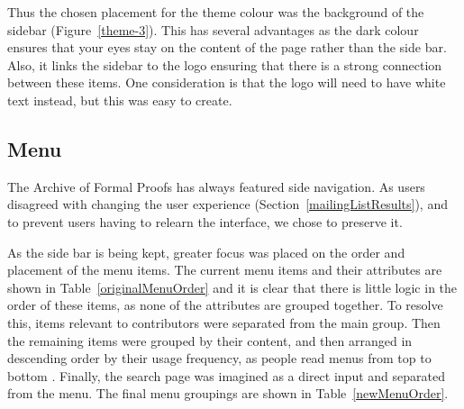 \documentclass[bsc,frontabs,oneside,singlespacing,parskip,deptreport,logo]{infthesis}
\begin{document}
Thus the chosen placement for the theme colour was the background of the sidebar (Figure~\ref{theme-3}).  This has several advantages as the dark colour ensures that your eyes stay on the content of the page rather than the side bar. Also, it links the sidebar to the logo ensuring that there is a strong connection between these items. One consideration is that the logo will need to have white text instead, but this was easy to create.  

\subsection{Menu} \label{sec:menu}

The Archive of Formal Proofs has always featured side navigation. As users disagreed with changing the user experience (Section~\ref{mailingListResults}), and to prevent users having to relearn the interface, we chose to preserve it. 

As the side bar is being kept, greater focus was placed on the order and placement of the menu items. The current menu items and their attributes are shown in Table~\ref{originalMenuOrder} and it is clear that there is little logic in the order of these items, as none of the attributes are grouped together. To resolve this, items relevant to contributors were separated from the main group. Then the remaining items were grouped by their content, and then arranged in descending order by their usage frequency,  as people read menus from top to bottom \cite{DBLP:conf/chi/ByrneADM99}. Finally, the search page was imagined as a direct input and separated from the menu. The final menu groupings are shown in Table~\ref{newMenuOrder}.

\end{document}
